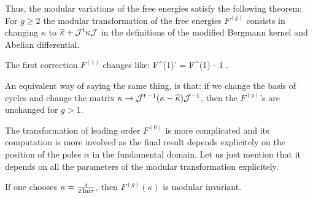 Thus, the modular variations of the free energies satisfy the following theorem:
\bt
\label{thmodular}
For $g\geq 2$ the modular transformation of the free energies $F^{(g)}$ consists in changing $\kappa$ to
$\widehat{\kappa} + {\cal{J}}^t \kappa {\cal{J}}$ in the definitions of the modified Bergmann kernel and Abelian differential.

The first correction $F^{(1)}$ changes like:
\beq
F^{(1)'} = F^{(1)} - {1} .
\eeq

An equivalent way of saying the same thing, is that:
if we change the basis of cycles and change the matrix $\kappa\to {\cal J}^{t\,-1}(\kappa-\widehat\kappa){\cal J}^{-1}$, then the $F^{(g)}$'s are unchanged for $g>1$.
\et
{}


\br
The transformation of leading order $F^{(0)}$ is more complicated and its computation is more involved
as the final result depends explicitely on the position of the poles $\alpha$ in the fundamental domain.
Let us just mention that it depends on all the parameters of the modular transformation explicitely.
\er

\bt
If one chooses $\kappa={i\over 2\, \Im\tau}$, then $F^{(g)}(\kappa)$ is modular invariant.
\et

